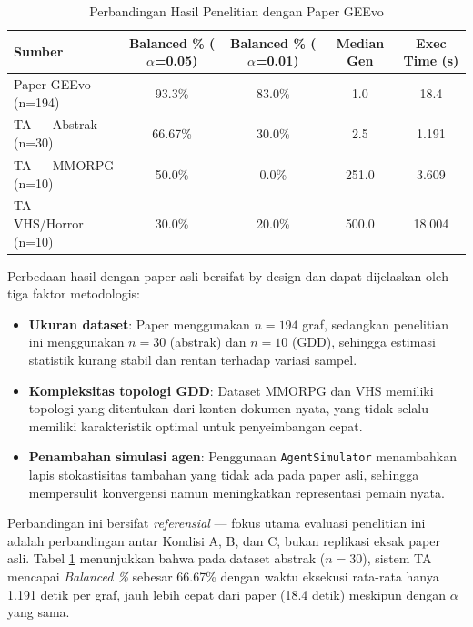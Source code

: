 \begin{table}[htbp]
\centering
\caption{Perbandingan Hasil Penelitian dengan Paper GEEvo \citep{Rupp_2024}}
\label{tab:paper_comparison}
\begin{tabular}{lcccc}
\hline
\textbf{Sumber} & \textbf{Balanced \% ($\alpha$=0.05)} & \textbf{Balanced \% ($\alpha$=0.01)} & \textbf{Median Gen} & \textbf{Exec Time (s)} \\
\hline
Paper GEEvo (n=194)    & 93.3\%  & 83.0\% & 1.0   & 18.4   \\
TA — Abstrak (n=30)    & 66.67\% & 30.0\% & 2.5   & 1.191  \\
TA — MMORPG (n=10)     & 50.0\%  & 0.0\%  & 251.0 & 3.609  \\
TA — VHS/Horror (n=10) & 30.0\%  & 20.0\% & 500.0 & 18.004 \\
\hline
\end{tabular}
\end{table}

Perbedaan hasil dengan paper asli bersifat by design dan dapat dijelaskan oleh tiga faktor metodologis:
\begin{itemize}
    \item \textbf{Ukuran dataset}: Paper menggunakan $n = 194$ graf, sedangkan penelitian ini menggunakan $n = 30$ (abstrak) dan $n = 10$ (GDD), sehingga estimasi statistik kurang stabil dan rentan terhadap variasi sampel.
    \item \textbf{Kompleksitas topologi GDD}: Dataset MMORPG dan VHS memiliki topologi yang ditentukan dari konten dokumen nyata, yang tidak selalu memiliki karakteristik optimal untuk penyeimbangan cepat.
    \item \textbf{Penambahan simulasi agen}: Penggunaan \texttt{AgentSimulator} menambahkan lapis stokastisitas tambahan yang tidak ada pada paper asli, sehingga mempersulit konvergensi namun meningkatkan representasi pemain nyata.
\end{itemize}

Perbandingan ini bersifat \textit{referensial} — fokus utama evaluasi penelitian ini adalah perbandingan antar Kondisi A, B, dan C, bukan replikasi eksak paper asli. Tabel \ref{tab:paper_comparison} menunjukkan bahwa pada dataset abstrak ($n=30$), sistem TA mencapai \textit{Balanced \%} sebesar 66.67\% dengan waktu eksekusi rata-rata hanya 1.191 detik per graf, jauh lebih cepat dari paper (18.4 detik) meskipun dengan $\alpha$ yang sama.
